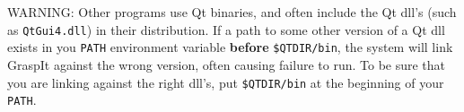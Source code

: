 %
%
%
%
%
%

WARNING: Other programs use Qt binaries, and often include the Qt
dll's (such as \texttt{QtGui4.dll}) in their distribution. If a path
to some other version of a Qt dll exists in you \texttt{PATH}
environment variable \textbf{before} \texttt{\$QTDIR/bin}, the system
will link GraspIt against the wrong version, often causing failure to
run. To be sure that you are linking against the right dll's, put
\texttt{\$QTDIR/bin} at the beginning of your \texttt{PATH}.

